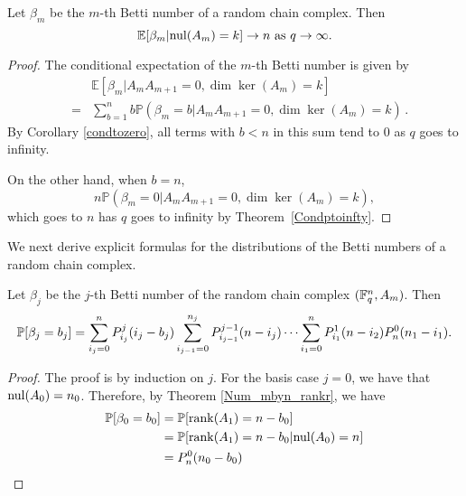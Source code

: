 \begin{corollary}
Let $\beta_m$ be the $m$-th Betti number of a random chain complex.  Then 
\[
\mathbb{E}[\beta_m | \mathrm{nul}(A_{m}) = k ] \to n \textrm{ as } q\to\infty.
\]
\begin{proof}
The conditional expectation of the $m$-th Betti number is given by
	\begin{eqnarray*}
	& & \mathbb{E}[\beta_m | A_{m}A_{m+1} = 0, \dim\ker(A_{m}) = k ]\\
	&=& \sum_{b=1}^n b \mathbb{P}(\beta_m = b | A_{m}A_{m+1} = 0, \dim\ker(A_{m}) = k ) \, .
	\end{eqnarray*}
By Corollary \ref{condtozero}, all terms with $b< n$ in this sum tend to 
$0$ as $q$ goes to infinity. 

On the other hand, when $b=n$, 
\[
n\mathbb{P}(\beta_m=0| A_{m}A_{m+1} = 0, \dim\ker(A_{m}) = k ),
\]
which goes to $n$ has $q$ goes to infinity by Theorem~\ref{Condptoinfty}.
\end{proof}
\end{corollary}

We next derive explicit formulas for the distributions of the Betti numbers of a random chain complex.




\begin{theorem} Let $\beta_j$ be the $j$-th Betti number of the random chain complex $(\mathbb{F}_q^{n} , A_m)$. Then
  \[
    \mathbb{P}[\beta_j = b_j] = \sum_{i_j=0}^{n} P^j_{i_j}(i_j-b_j)
    \sum_{i_{j-1}=0}^{n_{j}} P^{j-1}_{i_{j-1}}(n-i_j) \cdots
    \sum_{i_1=0}^{n}P^1_{i_1}(n-i_2)
    P^0_{n}(n_1-i_1).
  \]
\end{theorem}
\begin{proof}
The proof is by induction on $j$.  For the basis case $j=0$, we have that $\mathrm{nul}(A_0) = n_0$.  Therefore, by Theorem \ref{Num_mbyn_rankr}, we have
\begin{align*}
  \mathbb{P}[\beta_0 = b_0] 
   &= \mathbb{P}[\operatorname{\mathrm{rank}}(A_1) = n - b_0] \\
   &= \mathbb{P}[\operatorname{\mathrm{rank}}(A_1) = n - b_0 | \mathrm{nul}(A_0) = n] \\
   &= P^0_{n}(n_0 - b_0)
\end{align*}
\end{proof}
